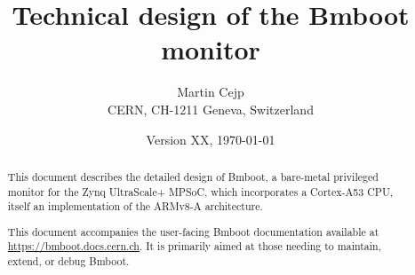 \documentclass{cernatsnote}
\title{Technical design of the Bmboot monitor}
\author{
	Martin Cejp \; \\		
	CERN, CH-1211 Geneva, Switzerland
}
\date{Version XX, \today}
\begin{document}
\maketitle

\begin{abstract}
This document describes the detailed design of Bmboot, a bare-metal privileged monitor for the Zynq UltraScale+ MPSoC, which incorporates a Cortex-A53 CPU, itself an implementation of the ARMv8-A architecture.

This document accompanies the user-facing Bmboot documentation available at \url{https://bmboot.docs.cern.ch}. It is primarily aimed at those needing to maintain, extend, or debug Bmboot.
\end{abstract}
\\ \\ \\ 

\begingroup
\color{black}
\tableofcontents
\endgroup

\pagebreak

	\clearpage
	\clearpage
	\clearpage
	\clearpage
	\clearpage
	\clearpage

 \clearpage




\end{document}
